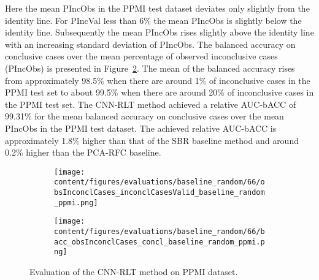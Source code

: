 Here the mean PIncObs in the PPMI test dataset deviates only slightly from the identity line.
For PIncVal less than 6\% the mean PIncObs is slightly below the identity line.
Subsequently the mean PIncObs rises slightly above the identity line with an increasing standard deviation of PIncObs.
The balanced accuracy on conclusive cases over the mean percentage of observed inconclusive cases (PIncObs) is presented 
in Figure~\ref{fig:bacc_obsInconclCases_concl_baseline_random_ppmi}.
The mean of the balanced accuracy rises from approximately 98.5\% 
when there are around 1\% of inconclusive cases in the PPMI test set to about 99.5\% 
when there are around 20\% of inconclusive cases in the PPMI test set.
The CNN-RLT method achieved a relative AUC-bACC of 99.31\% for the mean balanced accuracy on conclusive cases 
over the mean PIncObs in the PPMI test dataset.
The achieved relative AUC-bACC is approximately 1.8\% higher than that of the SBR baseline method 
and around 0.2\% higher than the PCA-RFC baseline.


\begin{figure}[ht]
  \begin{subfigure}{0.49\textwidth}
    \centering
    \texttt{[image: content/figures/evaluations/baseline\_random/66/obsInconclCases\_inconclCasesValid\_baseline\_random\_ppmi.png]}
    \label{fig:obsInconclCases_inconclCasesValid_baseline_random_ppmi}
  \end{subfigure}
  \hfill
  \begin{subfigure}{0.49\textwidth}
    \centering
    \texttt{[image: content/figures/evaluations/baseline\_random/66/bacc\_obsInconclCases\_concl\_baseline\_random\_ppmi.png]}
    \label{fig:bacc_obsInconclCases_concl_baseline_random_ppmi}
  \end{subfigure}
  \caption{Evaluation of the CNN-RLT method on PPMI dataset.}
  \label{fig:perf_eval_rlt_ppmi}
\end{figure}




